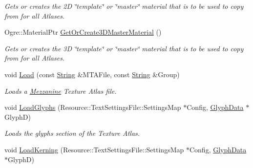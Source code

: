 \begin{DoxyCompactItemize}
\begin{DoxyCompactList}\small\item\em Gets or creates the 2D \char`\"{}template\char`\"{} or \char`\"{}master\char`\"{} material that is to be used to copy from for all Atlases. \item\end{DoxyCompactList}\item 
\hypertarget{classMezzanine_1_1UI_1_1TextureAtlas_ac7e3d616e3addb375417fe71454dc471}{
Ogre::MaterialPtr \hyperlink{classMezzanine_1_1UI_1_1TextureAtlas_ac7e3d616e3addb375417fe71454dc471}{GetOrCreate3DMasterMaterial} ()}
\label{classMezzanine_1_1UI_1_1TextureAtlas_ac7e3d616e3addb375417fe71454dc471}

\begin{DoxyCompactList}\small\item\em Gets or creates the 3D \char`\"{}template\char`\"{} or \char`\"{}master\char`\"{} material that is to be used to copy from for all Atlases. \item\end{DoxyCompactList}\item 
\hypertarget{classMezzanine_1_1UI_1_1TextureAtlas_abdece215b41ada34678730e591413003}{
void \hyperlink{classMezzanine_1_1UI_1_1TextureAtlas_abdece215b41ada34678730e591413003}{Load} (const \hyperlink{namespaceMezzanine_acf9fcc130e6ebf08e3d8491aebcf1c86}{String} \&MTAFile, const \hyperlink{namespaceMezzanine_acf9fcc130e6ebf08e3d8491aebcf1c86}{String} \&Group)}
\label{classMezzanine_1_1UI_1_1TextureAtlas_abdece215b41ada34678730e591413003}

\begin{DoxyCompactList}\small\item\em Loads a \hyperlink{namespaceMezzanine}{Mezzanine} Texture Atlas file. \item\end{DoxyCompactList}\item 
\hypertarget{classMezzanine_1_1UI_1_1TextureAtlas_ae590c7df9553e706d1b0a14a71661453}{
void \hyperlink{classMezzanine_1_1UI_1_1TextureAtlas_ae590c7df9553e706d1b0a14a71661453}{LoadGlyphs} (Resource::TextSettingsFile::SettingsMap $\ast$Config, \hyperlink{classMezzanine_1_1UI_1_1GlyphData}{GlyphData} $\ast$GlyphD)}
\label{classMezzanine_1_1UI_1_1TextureAtlas_ae590c7df9553e706d1b0a14a71661453}

\begin{DoxyCompactList}\small\item\em Loads the glyphs section of the Texture Atlas. \item\end{DoxyCompactList}\item 
\hypertarget{classMezzanine_1_1UI_1_1TextureAtlas_a62a32536f0d357a40c777293ce531ffd}{
void \hyperlink{classMezzanine_1_1UI_1_1TextureAtlas_a62a32536f0d357a40c777293ce531ffd}{LoadKerning} (Resource::TextSettingsFile::SettingsMap $\ast$Config, \hyperlink{classMezzanine_1_1UI_1_1GlyphData}{GlyphData} $\ast$GlyphD)}
\label{classMezzanine_1_1UI_1_1TextureAtlas_a62a32536f0d357a40c777293ce531ffd}


\end{DoxyCompactItemize}
